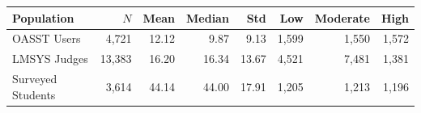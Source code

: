 \begin{tabular}{@{}lrrrrrrr@{}}
\toprule
Population & $N$ & Mean & Median & Std & Low & Moderate & High \\
\midrule
OASST Users & 4,721 & 12.12 & 9.87 & 9.13 & 1,599 & 1,550 & 1,572 \\
LMSYS Judges & 13,383 & 16.20 & 16.34 & 13.67 & 4,521 & 7,481 & 1,381 \\
Surveyed Students & 3,614 & 44.14 & 44.00 & 17.91 & 1,205 & 1,213 & 1,196 \\
\bottomrule
\end{tabular}